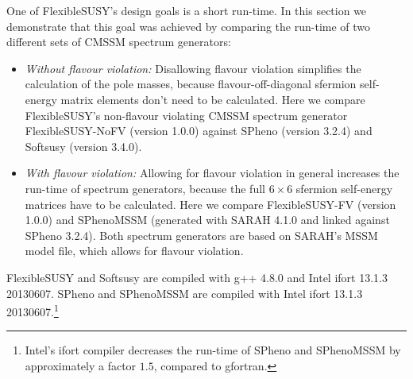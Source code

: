 \documentclass[final,3p,11pt,pdflatex]{elsarticle}
\makeatletter
\newcommand{\fs}{FlexibleSUSY\@\xspace}
\makeatother
\begin{document}
One of \fs's design goals is a short run-time.  In this section we
demonstrate that this goal was achieved by comparing the run-time of
two different sets of CMSSM spectrum generators:
%
\begin{itemize}
\item \emph{Without flavour violation:} Disallowing flavour violation
  simplifies the calculation of the pole masses, because
  flavour-off-diagonal sfermion self-energy matrix elements don't need
  to be calculated.  Here we compare \fs's non-flavour violating CMSSM
  spectrum generator FlexibleSUSY-NoFV (version 1.0.0) against SPheno
  (version 3.2.4) and Softsusy (version 3.4.0).
%
\item \emph{With flavour violation:} Allowing for flavour violation in
  general increases the run-time of spectrum generators, because the
  full $6\times 6$ sfermion self-energy matrices have to be
  calculated.  Here we compare FlexibleSUSY-FV (version 1.0.0) and
  SPhenoMSSM (generated with SARAH 4.1.0 and linked against SPheno
  3.2.4).  Both spectrum generators are based on SARAH's MSSM model
  file, which allows for flavour violation.
\end{itemize}
%
FlexibleSUSY and Softsusy are compiled with g++ 4.8.0 and Intel ifort
13.1.3 20130607.  SPheno and SPhenoMSSM are compiled with Intel ifort
13.1.3 20130607.\footnote{Intel's ifort compiler decreases the
  run-time of SPheno and SPhenoMSSM by approximately a factor $1.5$,
  compared to gfortran.}
\end{document}
